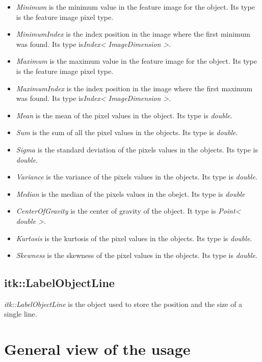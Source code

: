\documentclass{InsightArticle}
\begin{document}
\begin{itemize}
  \item {\em Minimum} is the minimum value in the feature image for the object. Its type is
the feature image pixel type.
  \item {\em MinimumIndex} is the index position in the image where the first minimum was
found. Its type is{\em Index< ImageDimension >}.
  \item {\em Maximum} is the maximum value in the feature image for the object. Its type is
the feature image pixel type.
  \item {\em MaximumIndex} is the index position in the image where the first maximum was
found. Its type is{\em Index< ImageDimension >}.
  \item {\em Mean} is the mean of the pixel values in the object. Its type is {\em double}.
  \item {\em Sum} is the sum of all the pixel values in the objects. Its type is {\em double}.
  \item {\em Sigma} is the standard deviation of the pixels values in the objects. Its type
is {\em double}.
  \item {\em Variance} is the variance of the pixels values in the objects. Its type is
{\em double}.
  \item {\em Median} is the median of the pixels values in the obejct. Its type is
{\em double}
  \item {\em CenterOfGravity} is the center of gravity of the object. It type is
{\em Point< double >}.
  \item {\em Kurtosis} is the kurtosis of the pixel values in the objects. Its type is
{\em double}.
  \item {\em Skewness} is the skewness of the pixel values in the objects. Its type is
{\em double}.
\end{itemize}


\subsection{itk::LabelObjectLine}

{\em itk::LabelObjectLine} is the object used to store the position and the size
of a single line.

\section{General view of the usage}
\end{document}
